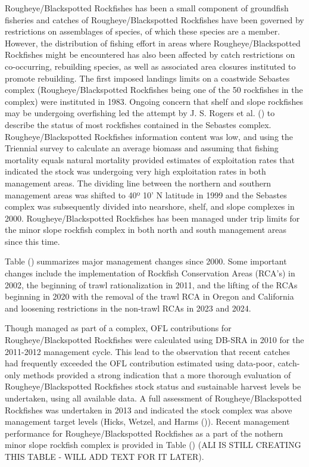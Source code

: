 \documentclass[
]{scrartcl}
\begin{document}
Rougheye/Blackspotted Rockfishes has been a small component of
groundfish fisheries and catches of Rougheye/Blackspotted Rockfishes
have been governed by restrictions on assemblages of species, of which
these species are a member. However, the distribution of fishing effort
in areas where Rougheye/Blackspotted Rockfishes might be encountered has
also been affected by catch restrictions on co-occurring, rebuilding
species, as well as associated area closures instituted to promote
rebuilding. The first imposed landings limits on a coastwide Sebastes
complex (Rougheye/Blackspotted Rockfishes being one of the 50 rockfishes
in the complex) were instituted in 1983. Ongoing concern that shelf and
slope rockfishes may be undergoing overfishing led the attempt by J. S.
Rogers et al. () to describe the
status of most rockfishes contained in the Sebastes complex.
Rougheye/Blackspotted Rockfishes information content was low, and using
the Triennial survey to calculate an average biomass and assuming that
fishing mortality equals natural mortality provided estimates of
exploitation rates that indicated the stock was undergoing very high
exploitation rates in both management areas. The dividing line between
the northern and southern management areas was shifted to 40º 10' N
latitude in 1999 and the Sebastes complex was subsequently divided into
nearshore, shelf, and slope complexes in 2000. Rougheye/Blackspotted
Rockfishes has been managed under trip limits for the minor slope
rockfish complex in both north and south management areas since this
time.

Table ()
summarizes major management changes since 2000. Some important changes
include the implementation of Rockfish Conservation Areas (RCA's) in
2002, the beginning of trawl rationalization in 2011, and the lifting of
the RCAs beginning in 2020 with the removal of the trawl RCA in Oregon
and California and loosening restrictions in the non-trawl RCAs in 2023
and 2024.

Though managed as part of a complex, OFL contributions for
Rougheye/Blackspotted Rockfishes were calculated using DB-SRA in 2010
for the 2011-2012 management cycle. This lead to the observation that
recent catches had frequently exceeded the OFL contribution estimated
using data-poor, catch-only methods provided a strong indication that a
more thorough evaluation of Rougheye/Blackspotted Rockfishes stock
status and sustainable harvest levels be undertaken, using all available
data. A full assessment of Rougheye/Blackspotted Rockfishes was
undertaken in 2013 and indicated the stock complex was above management
target levels (Hicks, Wetzel, and Harms
()). Recent management performance
for Rougheye/Blackspotted Rockfishes as a part of the nothern minor
slope rockfish complex is provided in Table
()
(ALI IS STILL CREATING THIS TABLE - WILL ADD TEXT FOR IT LATER).
\end{document}
